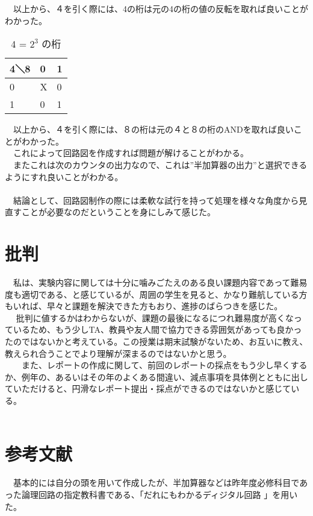 \documentclass{scrartcl}
\begin{document}
　以上から、４を引く際には、4の桁は元の4の桁の値の反転を取れば良いことがわかった。\\

\begin{table}[htbp]
\caption{4 = \(2^3\) の桁}
\centering
\begin{tabular}{|l|l|l|}
\hline
4＼8 & 0 & 1\\
\hline
0 & X & 0\\
1 & 0 & 1\\
\hline
\end{tabular}
\end{table}

　以上から、４を引く際には、８の桁は元の４と８の桁のANDを取れば良いことがわかった。\\

　これによって回路図を作成すれば問題が解けることがわかる。\\
　またこれは次のカウンタの出力なので、これは”半加算器の出力”と選択できるようにすれ良いことがわかる。\\
　\\
　結論として、回路図制作の際には柔軟な試行を持って処理を様々な角度から見直すことが必要なのだということを身にしみて感じた。\\

\section{批判}
\label{sec:org335a278}
  　私は、実験内容に関しては十分に噛みごたえのある良い課題内容であって難易度も適切である、と感じているが、周囲の学生を見ると、かなり難航している方もいれば、早々と課題を解決できた方もおり、進捗のばらつきを感じた。\\
　  批判に値するかはわからないが、課題の最後になるにつれ難易度が高くなっているため、もう少しTA、教員や友人間で協力できる雰囲気があっても良かったのではないかと考えている。この授業は期末試験がないため、お互いに教え、教えられ合うことでより理解が深まるのではないかと思う。\\
　　また、レポートの作成に関して、前回のレポートの採点をもう少し早くするか、例年の、あるいはその年のよくある間違い、減点事項を具体例とともに出していただけると、円滑なレポート提出・採点ができるのではないかと感じている。\\
　　\\

\section{参考文献}
\label{sec:org19f7a32}
　基本的には自分の頭を用いて作成したが、半加算器などは昨年度必修科目であった論理回路の指定教科書である、「だれにもわかるディジタル回路 \cite{book1}」を用いた。\\


\printbibliography[title=References]\\
\end{document}
